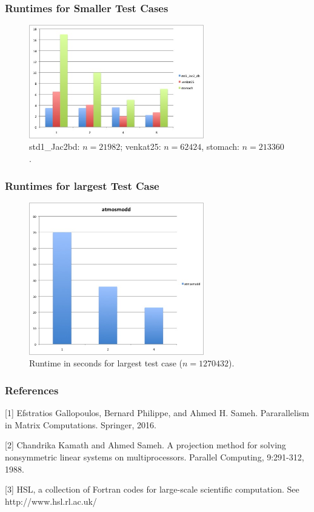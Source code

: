 \documentclass{beamer}
\begin{document}

\begin{frame}
\frametitle{Runtimes for Smaller Test Cases}
\begin{figure}[htbp] %
   \centering
   \includegraphics[width=3in]{Images/runtimes.jpg}
   \caption{std1\_Jac2bd: $n = 21982$; venkat25: $n=62424$, stomach: $n=213360$.}
\end{figure}
\end{frame}


\begin{frame}
\frametitle{Runtimes for largest Test Case}
\begin{figure}[htbp] %
   \centering
   \includegraphics[width=3in]{Images/atmosmodd.jpg}
   \caption{Runtime in seconds for largest test case ($n = 1270432$).}
\end{figure}
\end{frame}


\begin{frame}
\frametitle{References}

[1] Efstratios Gallopoulos, Bernard Philippe, and Ahmed H. Sameh. Pararallelism in Matrix Computations. Springer, 2016.

\vspace{.3in}

[2] Chandrika Kamath and Ahmed Sameh. A projection method for solving nonsymmetric linear systems on multiprocessors. Parallel Computing, 9:291-312, 1988.

\vspace{.3in}

[3] HSL, a collection of Fortran codes for large-scale scientific computation.
    See http://www.hsl.rl.ac.uk/

\end{frame}
\end{document}
